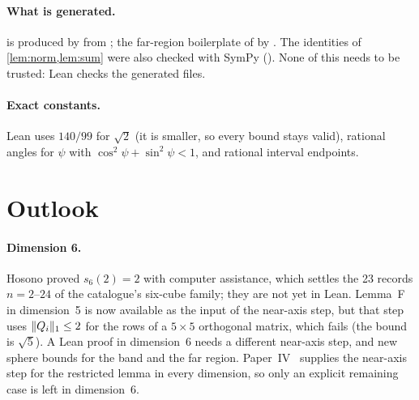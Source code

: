 \documentclass[11pt,a4paper]{article}
\begin{document}
\paragraph{What is generated.}  is produced by  from ; the far-region boilerplate of  by . The identities of \cref{lem:norm,lem:sum} were also checked with SymPy (). None of this needs to be trusted: Lean checks the generated files.

\paragraph{Exact constants.} Lean uses $140/99$ for $\sqrt2$ (it is smaller, so every bound stays valid), rational angles for $\psi$ with $\cos^2\psi+\sin^2\psi<1$, and rational interval endpoints.

\section{Outlook}\label{sec:outlook}

\paragraph{Dimension 6.} Hosono proved $s_6(2)=2$ with computer assistance, which settles the 23 records $n=2$--$24$ of the catalogue's six-cube family; they are not yet in Lean. Lemma~F in dimension~5 is now available as the input of the near-axis step, but that step uses $\lVert Q_i\rVert_1\le2$ for the rows of a $5\times5$ orthogonal matrix, which fails (the bound is $\sqrt5$). A Lean proof in dimension~6 needs a different near-axis step, and new sphere bounds for the band and the far region. Paper~IV~\cite{alldims} supplies the near-axis step for the restricted lemma in every dimension, so only an explicit remaining case is left in dimension~$6$.
\end{document}
